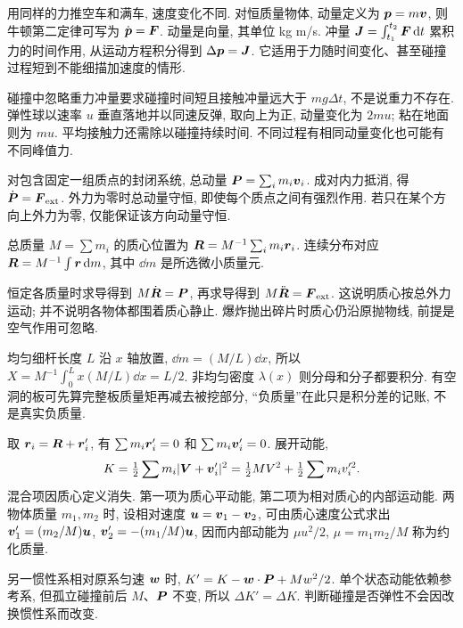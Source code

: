 \label{ch:momentum}
用同样的力推空车和满车, 速度变化不同. 对恒质量物体, 动量定义为 $\boldsymbol{p}=m\boldsymbol{v}$, 则牛顿第二定律可写为 $\dot{\boldsymbol{p}}=\boldsymbol{F}$. 动量是向量, 其单位 kg m/s. 冲量 $\boldsymbol{J}=\int_{t_1}^{t_2}\boldsymbol{F}\,\mathrm d t$ 累积力的时间作用, 从运动方程积分得到 $\Delta\boldsymbol{p}=\boldsymbol{J}$. 它适用于力随时间变化、甚至碰撞过程短到不能细描加速度的情形.

碰撞中忽略重力冲量要求碰撞时间短且接触冲量远大于 $mg\Delta t$, 不是说重力不存在. 弹性球以速率 $u$ 垂直落地并以同速反弹, 取向上为正, 动量变化为 $2mu$; 粘在地面则为 $mu$. 平均接触力还需除以碰撞持续时间. 不同过程有相同动量变化也可能有不同峰值力.

对包含固定一组质点的封闭系统, 总动量 $\boldsymbol{P}=\sum_i m_i\boldsymbol{v}_i$. 成对内力抵消, 得 $\dot{\boldsymbol{P}}=\boldsymbol{F}_{\rm ext}$. 外力为零时总动量守恒, 即使每个质点之间有强烈作用. 若只在某个方向上外力为零, 仅能保证该方向动量守恒.

\begin{definition}
总质量 $M=\sum m_i$ 的质心位置为 $\boldsymbol{R}=M^{-1}\sum_i m_i\boldsymbol{r}_i$. 连续分布对应 $\boldsymbol{R}=M^{-1}\int\boldsymbol{r}\,\mathrm d m$, 其中 $\dd m$ 是所选微小质量元.
\end{definition}
恒定各质量时求导得到 $M\dot{\boldsymbol{R}}=\boldsymbol{P}$, 再求导得到 $M\ddot{\boldsymbol{R}}=\boldsymbol{F}_{\rm ext}$. 这说明质心按总外力运动; 并不说明各物体都围着质心静止. 爆炸抛出碎片时质心仍沿原抛物线, 前提是空气作用可忽略.

均匀细杆长度 $L$ 沿 $x$ 轴放置, $\dd m=(M/L)\dd x$, 所以 $X=M^{-1}\int_0^Lx(M/L)\dd x=L/2$. 非均匀密度 $\lambda(x)$ 则分母和分子都要积分. 有空洞的板可先算完整板质量矩再减去被挖部分, “负质量”在此只是积分差的记账, 不是真实负质量.

取 $\boldsymbol{r}_i=\boldsymbol{R}+\boldsymbol{r}'_i$, 有 $\sum m_i\boldsymbol{r}'_i=0$ 和 $\sum m_i\boldsymbol{v}'_i=0$. 展开动能,
\begin{equation}
K=\tfrac12\sum m_i|\boldsymbol{V}+\boldsymbol{v}'_i|^2
=\tfrac12M V^2+\tfrac12\sum m_i v_i'^2.\label{eq:cmenergy}
\end{equation}
混合项因质心定义消失. 第一项为质心平动能, 第二项为相对质心的内部运动能. 两物体质量 $m_1,m_2$ 时, 设相对速度 $\boldsymbol{u}=\boldsymbol{v}_1-\boldsymbol{v}_2$, 可由质心速度公式求出 $\boldsymbol{v}'_1=(m_2/M)\boldsymbol{u}$, $\boldsymbol{v}'_2=-(m_1/M)\boldsymbol{u}$, 因而内部动能为 $\mu u^2/2$, $\mu=m_1m_2/M$ 称为约化质量.

另一惯性系相对原系匀速 $\boldsymbol{w}$ 时, $K'=K-\boldsymbol{w}\cdot\boldsymbol{P}+Mw^2/2$. 单个状态动能依赖参考系, 但孤立碰撞前后 $M$、$\boldsymbol{P}$ 不变, 所以 $\Delta K'=\Delta K$. 判断碰撞是否弹性不会因改换惯性系而改变.
